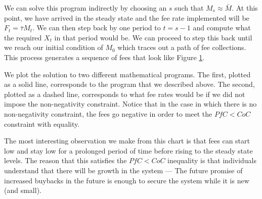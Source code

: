 We can solve this program indirectly by choosing an $s$ such that $M_s \approx \bar{M}$. At this
point, we have arrived in the steady state and the fee rate implemented will be
$F_t = \bar{\tau} M_t$. We can then step back by one period to $t = s - 1$ and compute what the
required $X_t$ in that period would be. We can proceed to step this back until we reach our initial
condition of $M_0$ which traces out a path of fee collections. This process generates a sequence of
fees that look like Figure \ref{fig:dg_tax_growth}.

\begin{center}
  \begin{figure}[H]
    \label{fig:dg_tax_growth}
  \end{figure}
\end{center}

We plot the solution to two different mathematical programs. The first, plotted as a solid line,
corresponds to the program that we described above. The second, plotted as a dashed line,
corresponds to what fee rates would be if we did not impose the non-negativity constraint. Notice
that in the case in which there is no non-negativity constraint, the fees go negative in order to
meet the $PfC < CoC$ constraint with equality.

The most interesting observation we make from this chart is that fees can start low and stay low
for a prolonged period of time before rising to the steady state levels. The reason that this
satisfies the $PfC < CoC$ inequality is that individuals understand that there will be growth in
the system --- The future promise of increased buybacks in the future is enough to secure the system
while it is new (and small).


